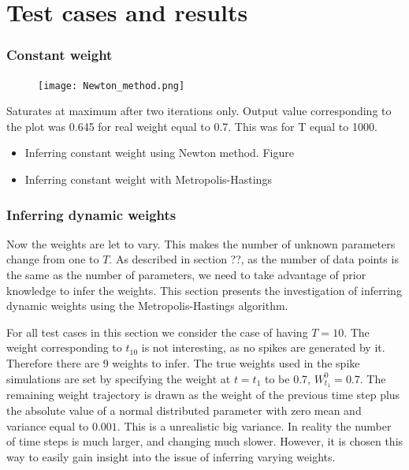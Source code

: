 
\chapter{Test cases and results}

\subsection{Constant weight}

\begin{figure}[hbt!]
    \centering
    \texttt{[image: Newton\_method.png]}
\end{figure}

Saturates at maximum after two iterations only. Output value corresponding to the plot was 0.645 for real weight equal to 0.7. This was for T equal to 1000.

\begin{itemize}
    \item Inferring constant weight using Newton method. Figure
    \item Inferring constant weight with Metropolis-Hastings
\end{itemize}

\subsection{Inferring dynamic weights}
Now the weights are let to vary. This makes the number of unknown parameters change from one to $T$. As described in section ??, as the number of data points is the same as the number of parameters, we need to take advantage of prior knowledge to infer the weights. This section presents the investigation of inferring dynamic weights using the Metropolis-Hastings algorithm.

For all test cases in this section we consider the case of having $T=10$. The weight corresponding to $t_{10}$ is not interesting, as no spikes are generated by it. Therefore there are 9 weights to infer. The true weights used in the spike simulations are set by specifying the weight at $t=t_1$ to be 0.7, $W_{t_1}^0 = 0.7$. The remaining weight trajectory is drawn as the weight of the previous time step plus the absolute value of a normal distributed parameter with zero mean and variance equal to $0.001$. This is a unrealistic big variance. In reality the number of time steps is much larger, and changing much slower. However, it is chosen this way to easily gain insight into the issue of inferring varying weights. \\

